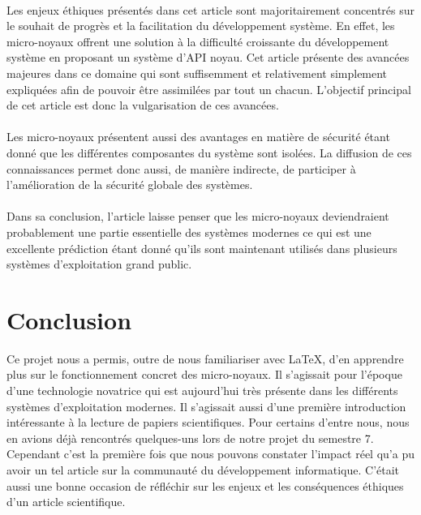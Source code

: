 \documentclass[a4paper, 12pt]{article}
\begin{document}
\paragraph{}
Les enjeux éthiques présentés dans cet article sont majoritairement concentrés sur le souhait de progrès et la facilitation du développement système. En effet, les micro-noyaux offrent une solution à la difficulté croissante du développement système en proposant un système d'API noyau. Cet article présente des avancées majeures dans ce domaine qui sont suffisemment et relativement simplement expliquées afin de pouvoir être assimilées par tout un chacun. L'objectif principal de cet article est donc la vulgarisation de ces avancées. \paragraph{}
Les micro-noyaux présentent aussi des avantages en matière de sécurité étant donné que les différentes composantes du système sont isolées. La diffusion de ces connaissances permet donc aussi, de manière indirecte, de participer à l'amélioration de la sécurité globale des systèmes.
\paragraph{}
Dans sa conclusion, l'article laisse penser que les micro-noyaux deviendraient probablement une partie essentielle des systèmes modernes ce qui est une excellente prédiction étant donné qu'ils sont maintenant utilisés dans plusieurs systèmes d'exploitation grand public.

\clearpage 
\section*{Conclusion}

Ce projet nous a permis, outre de nous familiariser avec \LaTeX{}, d'en apprendre plus sur le fonctionnement concret des micro-noyaux. Il s'agissait pour l'époque d'une technologie novatrice qui est aujourd'hui très présente dans les différents systèmes d'exploitation modernes. Il s'agissait aussi d'une première introduction intéressante à la lecture de papiers scientifiques. Pour certains d'entre nous, nous en avions déjà rencontrés quelques-uns lors de notre projet du semestre 7. Cependant c'est la première fois que nous pouvons constater l'impact réel qu'a pu avoir un tel article sur la communauté du développement informatique. C'était aussi une bonne occasion de réfléchir sur les enjeux et les conséquences éthiques d'un article scientifique.

\clearpage 




\clearpage 
\appendix
\end{document}
